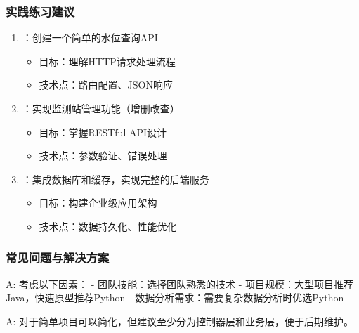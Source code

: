 \hypertarget{ux5b9eux8df5ux7ec3ux4e60ux5efaux8bae}{%
\subsubsection{实践练习建议}\label{ux5b9eux8df5ux7ec3ux4e60ux5efaux8bae}}

\begin{enumerate}
\def\labelenumi{\arabic{enumi}.}
\tightlist
\item
  ：创建一个简单的水位查询API

  \begin{itemize}
  \tightlist
  \item
    目标：理解HTTP请求处理流程
  \item
    技术点：路由配置、JSON响应
  \end{itemize}
\item
  ：实现监测站管理功能（增删改查）

  \begin{itemize}
  \tightlist
  \item
    目标：掌握RESTful API设计
  \item
    技术点：参数验证、错误处理
  \end{itemize}
\item
  ：集成数据库和缓存，实现完整的后端服务

  \begin{itemize}
  \tightlist
  \item
    目标：构建企业级应用架构
  \item
    技术点：数据持久化、性能优化
  \end{itemize}
\end{enumerate}

\hypertarget{ux5e38ux89c1ux95eeux9898ux4e0eux89e3ux51b3ux65b9ux6848}{%
\subsubsection{常见问题与解决方案}\label{ux5e38ux89c1ux95eeux9898ux4e0eux89e3ux51b3ux65b9ux6848}}


A: 考虑以下因素： - 团队技能：选择团队熟悉的技术 - 项目规模：大型项目推荐Java，快速原型推荐Python - 数据分析需求：需要复杂数据分析时优选Python


A: 对于简单项目可以简化，但建议至少分为控制器层和业务层，便于后期维护。

